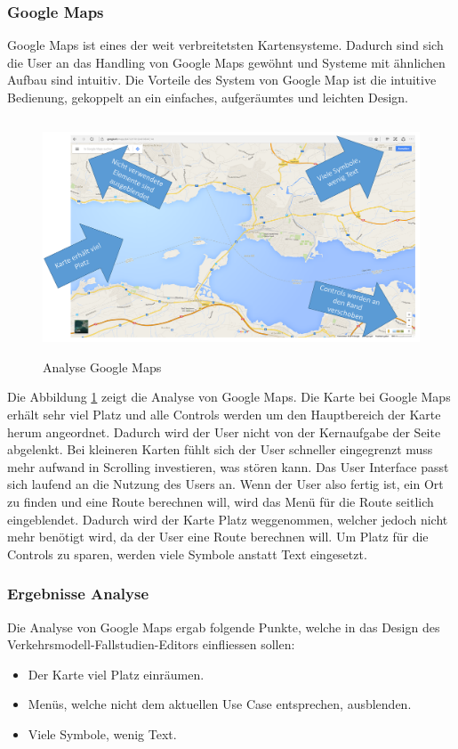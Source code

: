 \subsubsection{Google Maps}
Google Maps ist eines der weit verbreitetsten Kartensysteme. Dadurch sind sich die User an das Handling von Google Maps gewöhnt und Systeme mit ähnlichen Aufbau sind intuitiv. Die Vorteile des System von Google Map ist die intuitive Bedienung, gekoppelt an ein einfaches, aufgeräumtes und leichten Design.
\begin{figure}[H]
\centering
\includegraphics[height=7cm]{images/AnalyseGoogle.png}
\caption{Analyse Google Maps}
\label{fig:googlemaps}
\end{figure}
\noindent
Die Abbildung \ref{fig:googlemaps}  zeigt die Analyse von Google Maps. Die Karte bei Google Maps erhält sehr viel Platz und alle Controls werden um den Hauptbereich der Karte herum angeordnet. Dadurch wird der User nicht von der Kernaufgabe der Seite abgelenkt. Bei kleineren Karten fühlt sich der User schneller eingegrenzt muss mehr aufwand in Scrolling investieren, was stören kann. Das User Interface passt sich laufend an die Nutzung des Users an. Wenn der User also fertig ist, ein Ort zu finden und eine Route berechnen will, wird das Menü für die Route seitlich eingeblendet. Dadurch wird der Karte Platz weggenommen, welcher jedoch nicht mehr benötigt wird, da der User eine Route berechnen will. Um Platz für die Controls zu sparen, werden viele Symbole anstatt Text eingesetzt.
\subsubsection*{Ergebnisse Analyse}
Die Analyse von Google Maps ergab folgende Punkte, welche in das Design des Verkehrsmodell-Fallstudien-Editors einfliessen sollen:
\begin{itemize}
\item Der Karte viel Platz einräumen.
\item Menüs, welche nicht dem aktuellen Use Case entsprechen, ausblenden.
\item Viele Symbole, wenig Text.
\end{itemize}
\newpage
